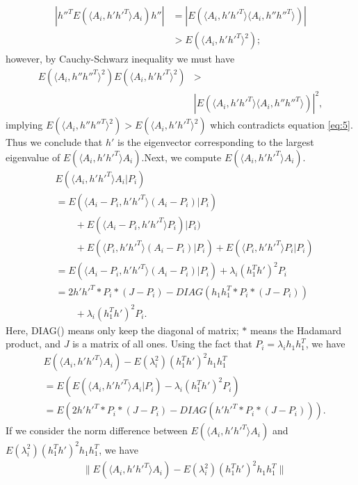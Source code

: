 \documentclass[10pt,journal,compsoc]{IEEEtran}
\newenvironment{proof}[1][Proof]{\begin{trivlist}
		\item[\hskip \labelsep {\bfseries #1}]}{\end{trivlist}}
\begin{document}
\begin{proof} [Proof of Theorem 4.2]
	\begin{align*}  | h''^T E(\langle A_{i},h' h'^T \rangle A_{i}) h''| &= |E(\langle A_{i},h' h'^T \rangle \langle A_{i},h'' h''^T \rangle)| \\
	&> E(\langle A_{i},h' h'^T \rangle ^2);
	\end{align*}
	however, by Cauchy-Schwarz inequality we must have
	\begin{align*} E(\langle A_{i},h'' h''^T \rangle^2)  E(\langle A_{i},h' h'^T \rangle^2) &> \\
	&|E(\langle A_{i},h' h'^T \rangle \langle A_{i},h'' h''^T \rangle)|^2,
	\end{align*}
	implying $E(\langle A_{i},h'' h''^T \rangle^2) > E(\langle A_{i},h' h'^T \rangle^2)$ which contradicts equation \eqref{eq:5}. Thus we conclude that $h'$ is the eigenvector corresponding to the largest eigenvalue of $E(\langle A_{i},h' h'^T \rangle A_{i})$.Next, we compute $E(\langle A_{i},h' h'^T \rangle A_{i})$.
	\begin{align*}
	&E(\langle A_{i},h' h'^T \rangle A_{i}|P_i)    \\
	&=E( \langle A_{i}-P_i,h' h'^T \rangle (A_{i}-P_i)|P_i)\\
	&\qquad {}+E(\langle A_{i}-P_i,h' h'^T \rangle P_i)|P_i) \\
	&\qquad {} +E(\langle P_i,h' h'^T \rangle (A_{i}-P_i)|P_i)+E(\langle P_i,h' h'^T \rangle P_i|P_i) \\
	&= E(\langle A_{i}-P_i,h' h'^T \rangle (A_{i}-P_i)|P_i) + \lambda_i (h_1^Th')^2 P_i \\
	&=  2h' h'^T *P_i*(J-P_i) - DIAG(h_1 h_1^T *P_i*(J-P_i)) 	\\
	&\qquad {}+\lambda_i (h_1^Th')^2 P_i .
	\end{align*}
	Here, DIAG() means only keep the diagonal of matrix; $*$ means the Hadamard product, and $J$ is a matrix of all ones. Using the fact that $P_i=\lambda_i h_1 h_1 ^T$, we have 
	\begin{align*}
	&E(\langle A_{i},h' h'^T \rangle A_{i}) - E(\lambda_i^2) (h_1^Th')^2 h_1 h_1^T \\
	&=E(E(\langle A_{i},h' h'^T \rangle A_{i}|P_i)-\lambda_i (h_1^Th')^2 P_i) 
	 \\
	&= E(2 h' h'^T *P_i*(J-P_i) - DIAG(h' h'^T*P_i*(J-P_i))).
	\end{align*}
	If we consider the norm difference between $E( \langle A_{i},h' h'^T \rangle A_{i})$ and $ E(\lambda_i^2) (h_1^Th')^2 h_1 h_1^T$, we have
	\begin{align*}
	&\|E(\langle A_{i},h' h'^T \rangle A_{i} ) - E(\lambda_i^2) (h_1^Th')^2 h_1 h_1^T\| \\

\end{align*}
\end{proof}
\end{document}
